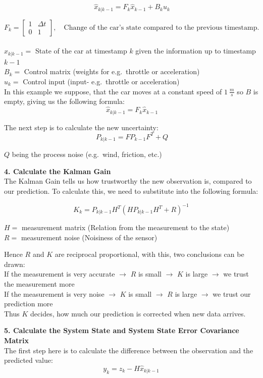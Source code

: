 \[
\ \hat{x}_{k|k-1} = F_k\hat{x}_{k-1} + B_k u_k
\]

\[
F_k =
\begin{bmatrix}
1 & \Delta t \\
0 & 1
\end{bmatrix}, \quad
\text{Change of the car's state compared to the previous timestamp.}
\]\\
$\hat{x}_{k|k-1} = $ State of the car at timestamp  $k$ given the information up to timestamp $k - 1$\\
$B_k = $ Control matrix (weights for e.g.\ throttle or acceleration)\\
$u_k = $ Control input (input- e.g.\ throttle or acceleration)\\

In this example we suppose, that the car moves at a constant speed of $1~\frac{m}{s}$ so $B$ is empty, giving us the following formula:\\
\[
\ \hat{x}_{k|k-1} = F_k\hat{x}_{k-1}
\]

The next step is to calculate the new uncertainty:\\
\[
\ P_{k|k-1} = FP_{k-1}F^T + Q
\]

$Q$ being the process noise (e.g.\ wind, friction, etc.)

{\large \textbf{4. Calculate the Kalman Gain}}\\[0.5em]
The Kalman Gain tells us how trustworthy the new observation is, compared to our prediction. To calculate this, we need to substitute into the following formula:

\[
K_k=P_{k|k-1}H^T{(HP_{k|k-1}H^T + R)}^{-1}
\]

$H = $ measurement matrix (Relation from the measurement to the state)\\
$R = $ measurement noise (Noisiness of the sensor)

Hence $R$ and $K$ are reciprocal proportional, with this, two conclusions can be drawn:\\
\small{If the measurement is very accurate $\rightarrow$ $R$ is small $\rightarrow$ $K$ is large $\rightarrow$ we trust the measurement more} \\
\small{If the measurement is very noise $\rightarrow$ $K$ is small $\rightarrow$ $R$ is large $\rightarrow$ we trust our prediction more} \\

Thus $K$ decides, how much our prediction is corrected when new data arrives.

{\large \textbf{5. Calculate the System State and System State Error Covariance Matrix}}\\[0.5em]
The first step here is to calculate the difference between the observation and the predicted value:\\
\[
y_k=z_k-H\hat{x}_{k|k-1}
\]

